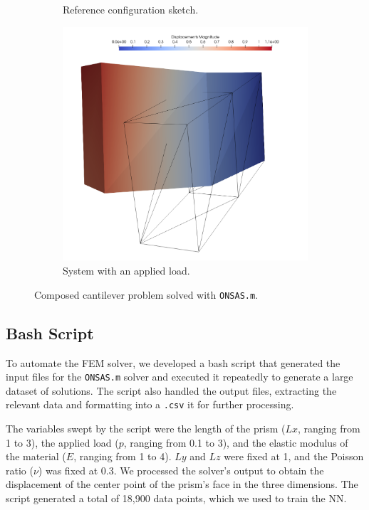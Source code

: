 \documentclass[oneside,a4paper,english,links]{amca}
\begin{document}
\begin{figure}[ht]
	\centering
	\begin{subfigure}[b]{0.48\textwidth}
	\def\svgwidth{\textwidth}
	
	\caption{Reference configuration sketch.}
	\label{fig:ex1_ilus}
	\end{subfigure}
	\hfill
	\begin{subfigure}[b]{0.48\textwidth}
	\centering
	\includegraphics[width=\textwidth]{Figures/Ejemplo2.png}
	\caption{System with an applied load.}
	\end{subfigure}
	\caption{Composed cantilever problem solved with \texttt{ONSAS.m}.}
	\label{fig:composed_cantilever_model}
\end{figure}


\subsection{Bash Script}
To automate the FEM solver, we developed a bash script that generated the input files for the \texttt{ONSAS.m} \citep{ONSAS} solver and executed it repeatedly to generate a large dataset of solutions. The script also handled the output files, extracting the relevant data and formatting into a \texttt{.csv} it for further processing.

The variables swept by the script were the length of the prism ($Lx$, ranging from 1 to 3), the applied load ($p$, ranging from 0.1 to 3), and the elastic modulus of the material ($E$, ranging from 1 to 4). $Ly$ and $Lz$ were fixed at 1, and the Poisson ratio ($\nu$) was fixed at 0.3. We processed the solver's output to obtain the displacement of the center point of the prism's face in the three dimensions. The script generated a total of 18,900 data points, which we used to train the NN.
\end{document}
